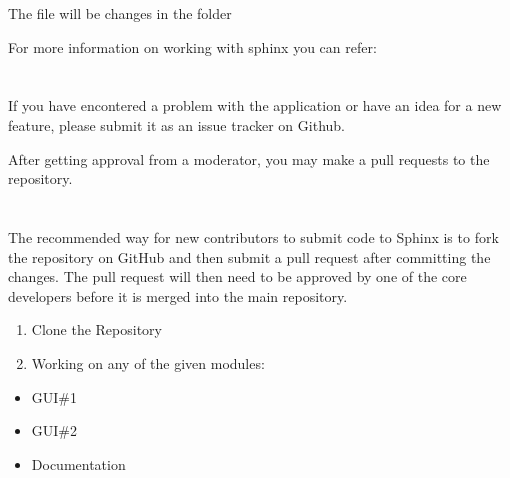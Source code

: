 \documentclass[letterpaper,10pt,english]{sphinxmanual}
\begin{document}
The file will be changes in the  folder

For more information on working with sphinx you can refer:


\section{}
\label{\detokenize{developer:bug-reports-and-feature-requests}}
If you have encontered a problem with the application or have an idea for a new feature, please submit it as an issue tracker on Github.

After getting approval from a moderator, you may make a pull requests to the repository.


\section{}
\label{\detokenize{developer:contributing-on-the-project}}
The recommended way for new contributors to submit code to Sphinx is to fork the repository on GitHub and then submit a pull request after committing the changes. The pull request will then need to be approved by one of the core developers before it is merged into the main repository.
\begin{enumerate}
%
\item {} 
Clone the Repository

\item {} 
Working on any of the given modules:

\end{enumerate}
\begin{itemize}
\item {} 
GUI\#1

\item {} 
GUI\#2

\item {} 
Documentation

\end{itemize}
\end{document}
